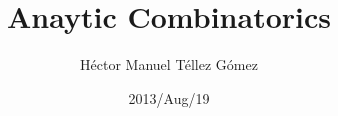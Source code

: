 ﻿\frontmatter
\title{Anaytic Combinatorics}
\author{Héctor Manuel Téllez Gómez}
\date{2013/Aug/19}
\maketitle

\tableofcontents

\mainmatter


